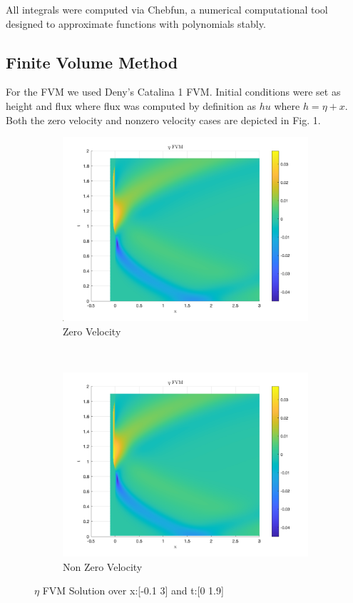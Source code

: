 \documentclass{article}
\begin{document}
All integrals were computed via Chebfun, a numerical computational tool designed to approximate functions with polynomials stably.


\subsection{Finite Volume Method}

For the FVM we used Deny's Catalina 1 FVM. Initial conditions were set as height and flux where flux was computed by definition as $h u$ where $h = \eta + x$. Both the zero velocity and nonzero velocity cases are depicted in Fig. 1. 


\begin{figure}[t!]
    \centering
    \begin{subfigure}[b]{0.5\textwidth}
        \includegraphics[scale=.25]{images/eta_FVM_0u.png} 
        \caption{Zero Velocity}
    \end{subfigure}%
    ~ 
    \begin{subfigure}[b]{0.5\textwidth}
        \includegraphics[scale=.25]{images/eta_FVM_non0u.png}
        \caption{Non Zero Velocity}
    \end{subfigure}
    \caption{$\eta$ FVM Solution over x:[-0.1 3] and t:[0 1.9]}
\end{figure}
\end{document}
